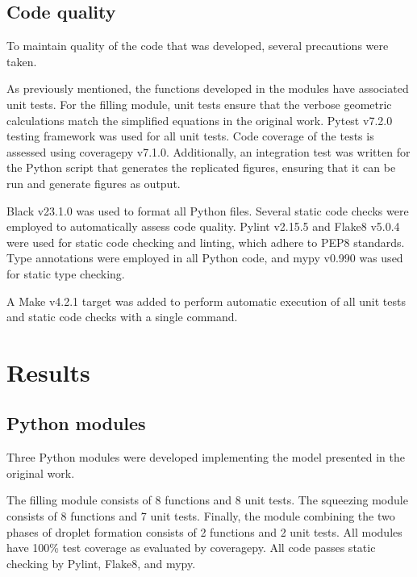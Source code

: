 \subsection{Code quality}

To maintain quality of the code that was developed, several precautions were taken.

As previously mentioned, the functions developed in the modules
have associated unit tests. For the filling module, unit tests ensure that the verbose
geometric calculations match the simplified equations in the original work.
Pytest\supercite{krekel_pytest_2004} v7.2.0 testing framework was used for all unit tests.
Code coverage of the tests is assessed using coveragepy\supercite{batchelder_coveragepy_nodate} v7.1.0.
Additionally, an integration test was written for the Python script that generates the
replicated figures, ensuring that it can be run and generate figures as output.

Black\supercite{langa_black_2018} v23.1.0 was used to format all Python files. 
Several static code checks were employed to automatically assess code quality.
Pylint\supercite{thenault_pylint_2001} v2.15.5 and
Flake8\supercite{ziade_flake8_2011} v5.0.4 were used for static code checking
and linting, which adhere to PEP8\supercite{van_rossum_pep_2001} standards. Type annotations were employed
in all Python code, and mypy\supercite{lehtosalo_mypy_2012} v0.990 was used for
static type checking.

A Make\supercite{feldman_gnu_1988} v4.2.1 target was added to perform automatic execution of all
unit tests and static code checks with a single command.

\section{Results}

\subsection{Python modules}

Three Python modules were developed implementing the model presented in the original work.

The filling module consists of 8 functions and 8 unit tests. The squeezing module consists
of 8 functions and 7 unit tests. Finally, the module combining the two phases of droplet formation
consists of  2 functions and 2 unit tests. All modules have 100\% test coverage as evaluated by
coveragepy. All code passes static checking by Pylint, Flake8, and mypy.

